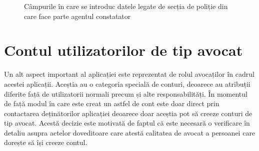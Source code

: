 \documentclass[12pt,a4paper]{report}
\theoremstyle{definition}
\theoremstyle{remark}
\begin{document}
\begin{figure}[H]
  \centering
  \hspace{2.0cm}
  \caption{Câmpurile în care se introduc datele legate de secția de poliție din care face parte agentul constatator}
\end{figure}

\newpage
\section{Contul utilizatorilor de tip avocat}
\vspace{20pt}
Un alt aspect important al aplicației este reprezentat de rolul avocaților în cadrul acestei aplicații. Aceștia au o categoria specială de conturi, deoarece au atribuții diferite față de utilizatorii normali precum și alte responsabilități. În momentul de față modul în care este creat un astfel de cont este doar direct prin contactarea deținătorilor aplicației deoarece doar aceștia pot să creeze conturi de tip avocat. Acestă decizie este motivată de faptul că este necesară o verificare în detaliu asupra actelor doveditoare care atestă calitatea de avocat a persoanei care dorește să își creeze contul.
\end{document}
